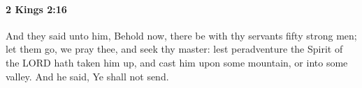 
		\paragraph{2 Kings 2:16} %
			\label{2KINGS-2-16}

			And they said unto him, Behold now, there be with thy servants fifty strong men; let them go, we pray thee, and seek thy master: lest peradventure the Spirit of the LORD hath taken him up, and cast him upon some mountain, or into some valley. And he said, Ye shall not send.



